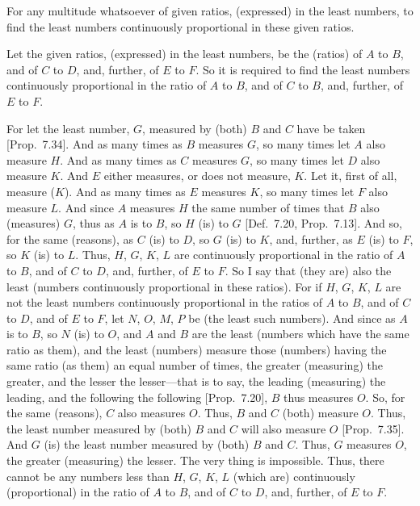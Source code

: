 \begin{Parallel}{}{}
{For any multitude whatsoever of given ratios, (expressed) in the least numbers, to find the least numbers continuously proportional 
in these given ratios.

\epsfysize=1.7in
\centerline{}

Let the given ratios, (expressed) in the least numbers, be the (ratios) of
$A$ to $B$, and of $C$ to $D$, and, further,  of $E$ to $F$. So it is
required to find the least numbers continuously proportional  in the
ratio of $A$ to $B$, and  of $C$ to $B$, and, further,
 of $E$ to $F$.
 
For let the least number, $G$,  measured by (both) $B$ and $C$ have
be taken [Prop.~7.34]. And as many times
as $B$ measures $G$, so many times let $A$ also measure $H$.
And as many times as $C$ measures $G$, so many times let
$D$ also measure $K$. And $E$ either measures, or does not measure, $K$.
Let it, first of all, measure ($K$). And as many times as $E$ measures
$K$, so many times let $F$ also measure $L$. And since $A$
measures $H$ the same number of times that $B$ also (measures) $G$, thus as $A$ is to $B$, so $H$ (is) to $G$ [Def.~7.20, Prop.~7.13].
And so, for the same (reasons), as $C$ (is) to $D$, so
$G$ (is) to $K$, and, further, as $E$ (is) to $F$, so $K$ (is) to $L$.
Thus, $H$, $G$, $K$, $L$ are continuously proportional in the ratio
of $A$ to $B$, and of $C$ to $D$, and, further,  of $E$ to $F$. So I say that (they are) also the least
(numbers continuously proportional in these ratios). For if
$H$, $G$, $K$, $L$ are not the least numbers continuously proportional
 in the ratios of $A$ to $B$, and of $C$ to $D$, and of
$E$ to $F$, let $N$, $O$, $M$, $P$ be (the least such numbers). 
And since as $A$ is to $B$, so $N$ (is) to $O$, and $A$ and $B$ are the
least (numbers which have the same ratio as them), and the least (numbers) measure those (numbers)
having the same ratio (as them) an equal number of times, the greater (measuring) the greater, and the lesser the lesser---that is to say, the leading (measuring) the leading, and the
following the following [Prop.~7.20], $B$ thus
measures $O$. So, for the same (reasons), $C$ also measures $O$. Thus,
$B$ and $C$ (both) measure $O$. Thus, the least number measured by
(both) $B$ and $C$ will also measure $O$ [Prop.~7.35]. And $G$ (is) the least number measured by (both) $B$ and $C$. Thus, $G$ measures $O$, the greater
(measuring) the lesser. The very thing is impossible. Thus, there
cannot be any numbers less than $H$, $G$, $K$, $L$ 
(which are) continuously (proportional) in the ratio of $A$ to $B$, and of $C$ to $D$, and, further, of $E$ to $F$.

}
\end{Parallel}
